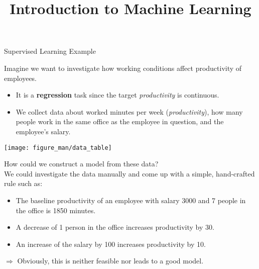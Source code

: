 \documentclass[11pt,compress,t,notes=noshow, xcolor=table]{beamer}
\title{Introduction to Machine Learning}
\begin{document}



\begin{vbframe}{Supervised Learning Example}

Imagine we want to investigate how working conditions affect productivity of employees.

\begin{itemize}
	\item It is a \textbf{regression} task since the target \emph{productivity} is continuous.
	\item We collect data about worked minutes 
per week (\emph{productivity}), how many people work in the same office as the 
employee in question, and the employee's salary.
\end{itemize}
  
\begin{center}
  \texttt{[image: figure\_man/data\_table]} 
\end{center}

\framebreak

How could we construct a model from these data?\\[1ex]

We could investigate the data manually and come up with a simple, hand-crafted rule such as:


\lz
    
\begin{itemize}
\item The baseline productivity of an employee with salary 3000 and 7 people in the office is 1850 minutes.
\item A decrease of 1 person in the office increases productivity by 30.
\item An increase of the salary by 100 increases productivity by 10.
\end{itemize}

\lz

$\Rightarrow$ Obviously, this is neither feasible nor leads to a good model.
\end{vbframe}
\end{document}
